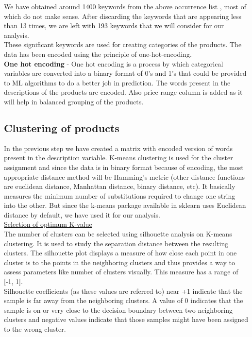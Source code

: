 We have obtained around 1400 keywords from the above occurrence list , most of which do not make sense. After discarding the keywords that are appearing less than 13 times, we are left with 193 keywords that we will consider for our analysis.\\

These significant keywords are used for creating categories of the products. The data has been encoded using the principle of one-hot-encoding.\\

\textbf{One hot encoding} - One hot encoding is a process by which categorical variables are converted into a binary format of 0's and 1's that could be provided to ML algorithms to do a better job in prediction. The words present in the descriptions of the products are encoded. Also price range column is added as it will help in balanced grouping of the products.\\

\subsection{Clustering of products}

In the previous step we have created a matrix with encoded version of words present in the description variable. K-means clustering is used for the cluster assignment and since the data is in binary format because of encoding, the most appropriate distance method will be Hamming's metric (other distance functions are euclidean distance, Manhattan distance, binary distance, etc). It basically measures the minimum number of substitutions required to change one string into the other. But since the k-means package available in sklearn uses Euclidean distance by default, we have used it for our analysis.\\

\underline{Selection of optimum K-value}\\

The number of clusters can be selected using silhouette analysis on K-means clustering. It is used to study the separation distance between the resulting clusters. The silhouette plot displays a measure of how close each point in one cluster is to the points in the neighboring clusters and thus provides a way to assess parameters like number of clusters visually. This measure has a range of [-1, 1].\\
Silhouette coefficients (as these values are referred to) near +1 indicate that the sample is far away from the neighboring clusters. A value of 0 indicates that the sample is on or very close to the decision boundary between two neighboring clusters and negative values indicate that those samples might have been assigned to the wrong cluster.\\

